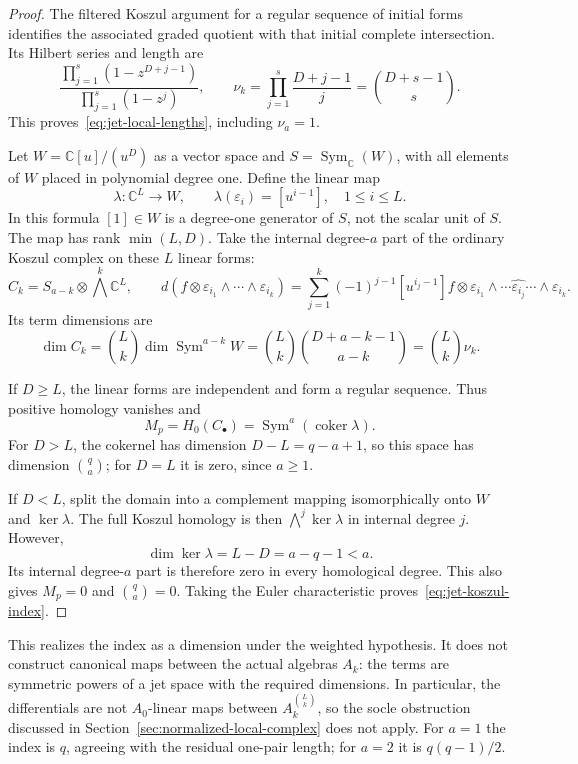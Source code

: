 \documentclass[11pt]{article}
\theoremstyle{definition}
\newcommand{\C}{\mathbb C}
\newcommand{\Sym}{\operatorname{Sym}}
\begin{document}
\begin{proof}
The filtered Koszul argument for a regular sequence of initial forms
identifies the associated graded quotient with that initial complete
intersection. Its Hilbert series and length are
\[
 \frac{\prod_{j=1}^s(1-z^{D+j-1})}
      {\prod_{j=1}^s(1-z^j)},\qquad
 \nu_k=\prod_{j=1}^s\frac{D+j-1}{j}
       =\binom{D+s-1}s.
\]
This proves~\eqref{eq:jet-local-lengths}, including $\nu_a=1$.

Let $W=\C[u]/(u^D)$ as a vector space and $S=\Sym_\C(W)$, with all
elements of $W$ placed in polynomial degree one. Define the linear map
\[
 \lambda:\C^L\longrightarrow W,\qquad
 \lambda(\varepsilon_i)=[u^{i-1}],\quad 1\le i\le L.
\]
In this formula $[1]\in W$ is a degree-one generator of $S$, not the
scalar unit of $S$. The map has rank $\min(L,D)$. Take the internal
degree-$a$ part of the ordinary Koszul complex on these $L$ linear
forms:
\[
 C_k=S_{a-k}\otimes\bigwedge^k\C^L,\qquad
 d(f\otimes\varepsilon_{i_1}\wedge\cdots\wedge\varepsilon_{i_k})
 =\sum_{j=1}^k(-1)^{j-1}[u^{i_j-1}]f\otimes
       \varepsilon_{i_1}\wedge\cdots\widehat{\varepsilon_{i_j}}
                      \cdots\wedge\varepsilon_{i_k}.
\]
Its term dimensions are
\[
 \dim C_k=\binom Lk\dim\Sym^{a-k}W
          =\binom Lk\binom{D+a-k-1}{a-k}
          =\binom Lk\nu_k.
\]

If $D\ge L$, the linear forms are independent and form a regular
sequence. Thus positive homology vanishes and
\[
 M_p=H_0(C_\bullet)=\Sym^a(\operatorname{coker}\lambda).
\]
For $D>L$, the cokernel has dimension $D-L=q-a+1$, so this space has
dimension $\binom qa$; for $D=L$ it is zero, since $a\ge1$.

If $D<L$, split the domain into a complement mapping isomorphically
onto $W$ and $\ker\lambda$. The full Koszul homology is then
$\bigwedge^j\ker\lambda$ in internal degree $j$. However,
\[
 \dim\ker\lambda=L-D=a-q-1<a.
\]
Its internal degree-$a$ part is therefore zero in every homological
degree. This also gives $M_p=0$ and $\binom qa=0$. Taking the Euler
characteristic proves~\eqref{eq:jet-koszul-index}.
\end{proof}

This realizes the index as a dimension under the weighted hypothesis.
It does not construct canonical maps between the actual algebras $A_k$:
the terms are symmetric powers of a jet space with the required
dimensions. In particular, the differentials are not $A_0$-linear maps
between $A_k^{\binom Lk}$, so the socle obstruction discussed in
Section~\ref{sec:normalized-local-complex} does not apply. For $a=1$
the index is $q$, agreeing with the residual one-pair length; for $a=2$
it is $q(q-1)/2$.
\end{document}

